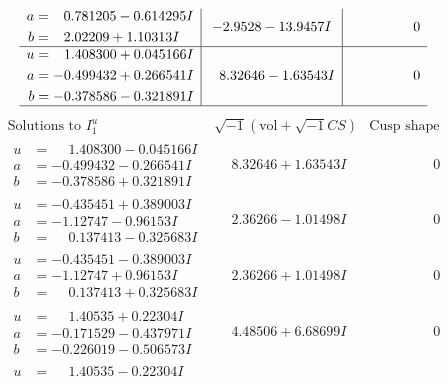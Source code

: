 \documentclass[1p]{elsarticle_modified}
\theoremstyle{definition}
\newcommand{\I}{\sqrt{-1}}
\begin{document}
$$\begin{array}{c|c|c}
\begin{aligned}
a &= \phantom{-}0.781205 - 0.614295 I \\
b &= \phantom{-}2.02209 + 1.10313 I\end{aligned}
 & -2.9528 - 13.9457 I & \phantom{-0.000000 } 0 \\ \hline\begin{aligned}
u &= \phantom{-}1.408300 + 0.045166 I \\
a &= -0.499432 + 0.266541 I \\
b &= -0.378586 - 0.321891 I\end{aligned}
 & \phantom{-}8.32646 - 1.63543 I & \phantom{-0.000000 } 0\\
 \hline 
 \end{array}$$\newpage$$\begin{array}{c|c|c}  
\text{Solutions to }I^u_{1}& \I (\text{vol} + \sqrt{-1}CS) & \text{Cusp shape}\\
 \hline 
\begin{aligned}
u &= \phantom{-}1.408300 - 0.045166 I \\
a &= -0.499432 - 0.266541 I \\
b &= -0.378586 + 0.321891 I\end{aligned}
 & \phantom{-}8.32646 + 1.63543 I & \phantom{-0.000000 } 0 \\ \hline\begin{aligned}
u &= -0.435451 + 0.389003 I \\
a &= -1.12747 - 0.96153 I \\
b &= \phantom{-}0.137413 - 0.325683 I\end{aligned}
 & \phantom{-}2.36266 - 1.01498 I & \phantom{-0.000000 } 0 \\ \hline\begin{aligned}
u &= -0.435451 - 0.389003 I \\
a &= -1.12747 + 0.96153 I \\
b &= \phantom{-}0.137413 + 0.325683 I\end{aligned}
 & \phantom{-}2.36266 + 1.01498 I & \phantom{-0.000000 } 0 \\ \hline\begin{aligned}
u &= \phantom{-}1.40535 + 0.22304 I \\
a &= -0.171529 - 0.437971 I \\
b &= -0.226019 - 0.506573 I\end{aligned}
 & \phantom{-}4.48506 + 6.68699 I & \phantom{-0.000000 } 0 \\ \hline\begin{aligned}
u &= \phantom{-}1.40535 - 0.22304 I \\

\end{aligned}
\end{array}$$
\end{document}
